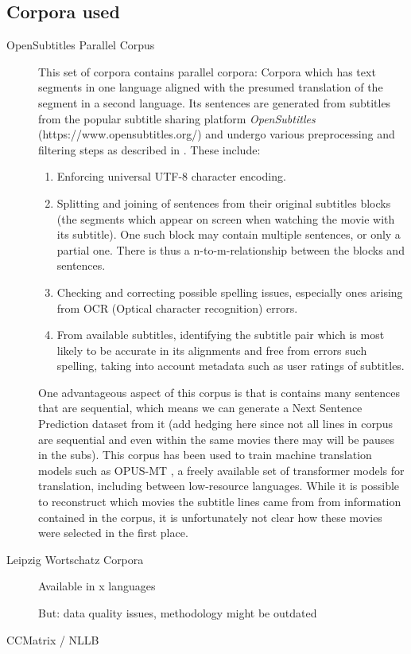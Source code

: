 \subsection{Corpora used}
\begin{description}
	\item[OpenSubtitles Parallel Corpus]
	      This set of corpora contains parallel corpora:
	      Corpora which has text segments in one language aligned with the presumed translation of the segment in a second language.
	      Its sentences are generated from subtitles from the popular subtitle sharing platform \textit{OpenSubtitles} (https://www.opensubtitles.org/) and undergo various preprocessing and filtering steps as described in \cite{lisonOpensubtitles2016ExtractingLarge2016}.
	      These include:
	      \begin{enumerate}
		      \item Enforcing universal UTF-8 character encoding.
		      \item
		            Splitting and joining of sentences from their original subtitles blocks (the segments which appear on screen when watching the movie with its subtitle).
		            One such block may contain multiple sentences, or only a partial one.
		            There is thus a n-to-m-relationship between the blocks and sentences.
		      \item Checking and correcting possible spelling issues, especially ones arising from OCR (Optical character recognition) errors.
		      \item From available subtitles, identifying the subtitle pair which is most likely to be accurate in its alignments and free from errors such spelling, taking into account metadata such as user ratings of subtitles.

	      \end{enumerate}
		  One advantageous aspect of this corpus is that is contains many sentences that are sequential, which means we can generate a Next Sentence Prediction dataset from it (add hedging here since not all lines in corpus are sequential and even within the same movies there may will be pauses in the subs).
		  This corpus has been used to train machine translation models such as OPUS-MT \cite{tiedemannOPUSMTbuildingOpenTranslation2020}, a freely available set of transformer models for translation, including between low-resource languages. 
		  While it is possible to reconstruct which movies the subtitle lines came from from information contained in the corpus, it is unfortunately not clear how these movies were selected in the first place.

	\item[Leipzig Wortschatz Corpora]
		Available in x languages

		But: data quality issues, methodology might be outdated

		\cite{goldhahnBuildingLargeMonolingual2012}
	\item[CCMatrix / NLLB]

\end{description}

